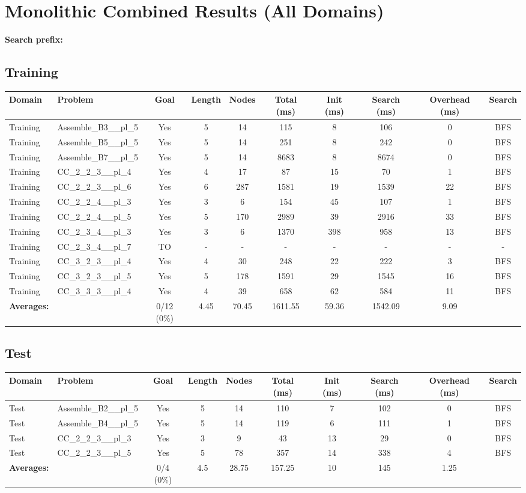 \documentclass{article}
\begin{document}
\section*{Monolithic Combined Results (All Domains)}
\textbf{Search prefix:} 
\\[0.5cm]
\subsection*{Training}
\begin{tabular}{llcccccccc}
\toprule
Domain & Problem & Goal & Length & Nodes & Total (ms) & Init (ms) & Search (ms) & Overhead (ms) & Search \\
\midrule
Training & Assemble\_B3\_\_pl\_5 & Yes & 5 & 14 & 115 & 8 & 106 & 0 & BFS \\
Training & Assemble\_B5\_\_pl\_5 & Yes & 5 & 14 & 251 & 8 & 242 & 0 & BFS \\
Training & Assemble\_B7\_\_pl\_5 & Yes & 5 & 14 & 8683 & 8 & 8674 & 0 & BFS \\
Training & CC\_2\_2\_3\_\_pl\_4 & Yes & 4 & 17 & 87 & 15 & 70 & 1 & BFS \\
Training & CC\_2\_2\_3\_\_pl\_6 & Yes & 6 & 287 & 1581 & 19 & 1539 & 22 & BFS \\
Training & CC\_2\_2\_4\_\_pl\_3 & Yes & 3 & 6 & 154 & 45 & 107 & 1 & BFS \\
Training & CC\_2\_2\_4\_\_pl\_5 & Yes & 5 & 170 & 2989 & 39 & 2916 & 33 & BFS \\
Training & CC\_2\_3\_4\_\_pl\_3 & Yes & 3 & 6 & 1370 & 398 & 958 & 13 & BFS \\
Training & CC\_2\_3\_4\_\_pl\_7 & TO & - & - & - & - & - & - & - \\
Training & CC\_3\_2\_3\_\_pl\_4 & Yes & 4 & 30 & 248 & 22 & 222 & 3 & BFS \\
Training & CC\_3\_2\_3\_\_pl\_5 & Yes & 5 & 178 & 1591 & 29 & 1545 & 16 & BFS \\
Training & CC\_3\_3\_3\_\_pl\_4 & Yes & 4 & 39 & 658 & 62 & 584 & 11 & BFS \\
\textbf{Averages:} & & 0/12 (0\%) & 4.45 & 70.45 & 1611.55 & 59.36 & 1542.09 & 9.09 & \\
\bottomrule
\end{tabular}
\newpage
\subsection*{Test}
\begin{tabular}{llcccccccc}
\toprule
Domain & Problem & Goal & Length & Nodes & Total (ms) & Init (ms) & Search (ms) & Overhead (ms) & Search \\
\midrule
Test & Assemble\_B2\_\_pl\_5 & Yes & 5 & 14 & 110 & 7 & 102 & 0 & BFS \\
Test & Assemble\_B4\_\_pl\_5 & Yes & 5 & 14 & 119 & 6 & 111 & 1 & BFS \\
Test & CC\_2\_2\_3\_\_pl\_3 & Yes & 3 & 9 & 43 & 13 & 29 & 0 & BFS \\
Test & CC\_2\_2\_3\_\_pl\_5 & Yes & 5 & 78 & 357 & 14 & 338 & 4 & BFS \\
\textbf{Averages:} & & 0/4 (0\%) & 4.5 & 28.75 & 157.25 & 10 & 145 & 1.25 & \\
\bottomrule
\end{tabular}
\newpage
\end{document}
